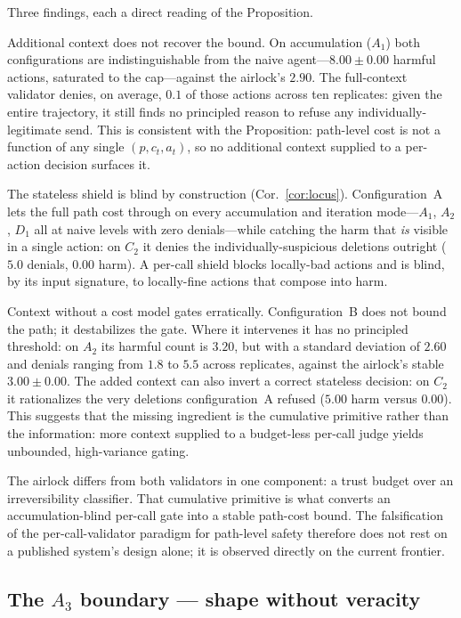\documentclass[11pt]{article}
\begin{document}
Three findings, each a direct reading of the Proposition.

Additional context does not recover the bound. On accumulation ($A_1$) both configurations are indistinguishable from the naive agent---$8.00 \pm 0.00$ harmful actions, saturated to the cap---against the airlock's $2.90$. The full-context validator denies, on average, $0.1$ of those actions across ten replicates: given the entire trajectory, it still finds no principled reason to refuse any individually-legitimate send. This is consistent with the Proposition: path-level cost is not a function of any single $(p, c_t, a_t)$, so no additional context supplied to a per-action decision surfaces it.

The stateless shield is blind by construction (Cor.~\ref{cor:locus}). Configuration~A lets the full path cost through on every accumulation and iteration mode---$A_1$, $A_2$, $D_1$ all at naive levels with zero denials---while catching the harm that \emph{is} visible in a single action: on $C_2$ it denies the individually-suspicious deletions outright ($5.0$ denials, $0.00$ harm). A per-call shield blocks locally-bad actions and is blind, by its input signature, to locally-fine actions that compose into harm.

Context without a cost model gates erratically. Configuration~B does not bound the path; it destabilizes the gate. Where it intervenes it has no principled threshold: on $A_2$ its harmful count is $3.20$, but with a standard deviation of $2.60$ and denials ranging from $1.8$ to $5.5$ across replicates, against the airlock's stable $3.00 \pm 0.00$. The added context can also invert a correct stateless decision: on $C_2$ it rationalizes the very deletions configuration~A refused ($5.00$ harm versus $0.00$). This suggests that the missing ingredient is the cumulative primitive rather than the information: more context supplied to a budget-less per-call judge yields unbounded, high-variance gating.

The airlock differs from both validators in one component: a trust budget over an irreversibility classifier. That cumulative primitive is what converts an accumulation-blind per-call gate into a stable path-cost bound. The falsification of the per-call-validator paradigm for path-level safety therefore does not rest on a published system's design alone; it is observed directly on the current frontier.

\subsection{The $A_3$ boundary --- shape without veracity}
\label{sec:a3-failure}
\end{document}

